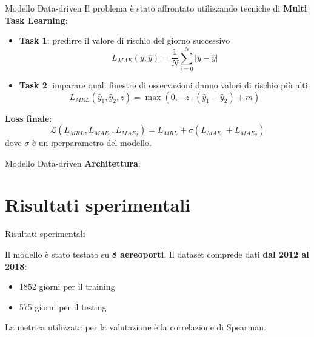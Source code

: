 \documentclass[10pt]{beamer}
\begin{document}
\begin{frame}{Modello Data-driven}
Il problema è stato affrontato utilizzando tecniche di \textbf{Multi Task Learning}:
\begin{itemize}
    \item \textbf{Task 1}: predirre il valore di rischio del giorno successivo
    {{\scriptsize\begin{equation}\label{MAE}
    L_{MAE}(y, \hat y)=\frac{1}{N}\sum_{i=0}^N |y - \hat y|
    \end{equation}}\small} \pause
    \item \textbf{Task 2}: imparare quali finestre di osservazioni danno valori di rischio più alti
    {{\scriptsize\begin{equation}\label{MRL}
    L_{MRL}(\hat y_1, \hat y_2, z) = \max(0, -z \cdot (\hat y_1 - \hat y_2) + m)
    \end{equation}}\small}
\end{itemize}\pause
\textbf{Loss finale}:
\begin{equation}\label{custom_loss}
\mathcal{L}(L_{MRL}, L_{MAE_{1}}, L_{MAE_{2}})= L_{MRL} + \sigma(L_{MAE_{1}} + L_{MAE_{2}})
\end{equation}
dove $\sigma$ è un iperparametro del modello.
\end{frame}

\begin{frame}{Modello Data-driven}
\textbf{Architettura}:
\begin{figure}
	\centering
\end{figure}
\end{frame}


\section{Risultati sperimentali}
\begin{frame}{Risultati sperimentali}

Il modello è stato testato su \textbf{8 aereoporti}.
Il dataset comprede dati \textbf{dal 2012 al 2018}:
\begin{itemize}
    \item 1852 giorni per il training
    \item 575 giorni per il testing
\end{itemize}

La metrica utilizzata per la valutazione è la correlazione di Spearman.


\end{frame}
\end{document}
